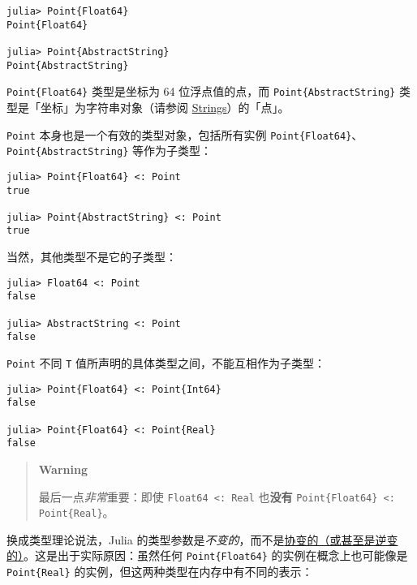 \begin{verbatim}
julia> Point{Float64}
Point{Float64}

julia> Point{AbstractString}
Point{AbstractString}
\end{verbatim}



\texttt{Point\{Float64\}} 类型是坐标为 64 位浮点值的点，而 \texttt{Point\{AbstractString\}} 类型是「坐标」为字符串对象（请参阅 \href{@id man-strings}{Strings}）的「点」。



\texttt{Point} 本身也是一个有效的类型对象，包括所有实例 \texttt{Point\{Float64\}}、\texttt{Point\{AbstractString\}} 等作为子类型：




\begin{verbatim}
julia> Point{Float64} <: Point
true

julia> Point{AbstractString} <: Point
true
\end{verbatim}



当然，其他类型不是它的子类型：




\begin{verbatim}
julia> Float64 <: Point
false

julia> AbstractString <: Point
false
\end{verbatim}



\texttt{Point} 不同 \texttt{T} 值所声明的具体类型之间，不能互相作为子类型：




\begin{verbatim}
julia> Point{Float64} <: Point{Int64}
false

julia> Point{Float64} <: Point{Real}
false
\end{verbatim}



\begin{quote}
\textbf{Warning}

最后一点\emph{非常}重要：即使 \texttt{Float64 <: Real} 也\textbf{没有} \texttt{Point\{Float64\} <: Point\{Real\}}。

\end{quote}


换成类型理论说法，Julia 的类型参数是\emph{不变的}，而不是\href{https://en.wikipedia.org/wiki/Covariance\_and\_contravariance\_\%28computer\_science\%29}{协变的（或甚至是逆变的）}。这是出于实际原因：虽然任何 \texttt{Point\{Float64\}} 的实例在概念上也可能像是 \texttt{Point\{Real\}} 的实例，但这两种类型在内存中有不同的表示：



